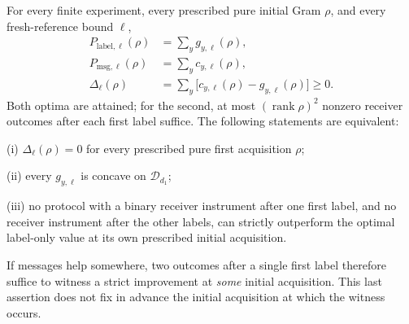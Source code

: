 \begin{theorem}\label{thm:messagecriterion96}
For every finite experiment, every prescribed pure initial Gram
$\rho$, and every fresh-reference bound $\ell$,
\begin{equation}\label{eq:messagecriterion96}
 \begin{split}
 P_{\mathrm{label},\ell}(\rho)&=\sum_yg_{y,\ell}(\rho),\\
 P_{\mathrm{msg},\ell}(\rho)&=\sum_yc_{y,\ell}(\rho),\\
 \Delta_\ell(\rho)&=
       \sum_y\bigl[c_{y,\ell}(\rho)-g_{y,\ell}(\rho)\bigr]\ge0.
 \end{split}
\end{equation}
Both optima are attained; for the second, at most
$(\operatorname{rank}\rho)^2$ nonzero receiver outcomes after each
first label suffice.  The following statements are equivalent:

\smallskip
\noindent (i) $\Delta_\ell(\rho)=0$ for every prescribed pure first
acquisition $\rho$;

\noindent (ii) every $g_{y,\ell}$ is concave on $\mathcal D_{d_1}$;

\noindent (iii) no protocol with a binary receiver instrument after
one first label, and no receiver instrument after the other labels,
can strictly outperform the optimal label-only value at its own
prescribed initial acquisition.

\smallskip
If messages help somewhere, two outcomes after a single first label
therefore suffice to witness a strict improvement at \emph{some}
initial acquisition.  This last assertion does not fix in advance the
initial acquisition at which the witness occurs.
\end{theorem}
